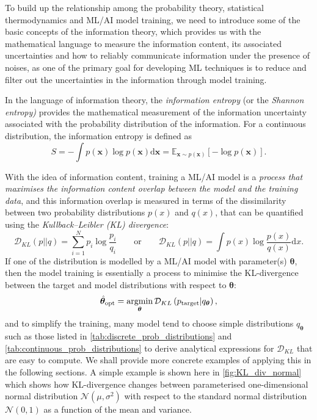 
To build up the relationship among the probability theory, statistical thermodynamics and ML/AI model training, we need to introduce some of the basic concepts of the information theory, which provides us with the mathematical language to measure the information content, its associated uncertainties and how to reliably communicate information under the presence of noises, as one of the primary goal for developing ML techniques is to reduce and filter out the uncertainties in the information through model training. 

In the language of information theory, the \emph{information entropy} (or the \emph{Shannon entropy)} provides the mathematical measurement of the information uncertainty associated with the probability distribution of the information. For a continuous distribution, the information entropy is defined as
\begin{equation}
    \label{eq:information_entropy}
    S=-\int p(\bm{x})\log p(\bm{x})\mbox{d}\bm{x}=\mathbb{E}_{\bm{x}\sim p(\bm{x})}\left[-\log p(\bm{x})\right].
\end{equation}


With the idea of information content, training a ML/AI model is a \textit{process that maximises the information content overlap between the model and the training data}, and this information overlap is measured in terms of the dissimilarity between two probability distributions $p(x)$ and $q(x)$, that can be quantified using the \textit{Kullback–Leibler (KL) divergence}:
\begin{equation}
    \label{eq:KL_divergence}
    \mathcal{D}_{KL}(p||q)=\sum_{i=1}^{N}p_i\log\frac{p_i}{q_i}\qquad\mbox{or}\qquad \mathcal{D}_{KL}(p||q)=\int p(x)\log\frac{p(x)}{q(x)}\mbox{d}x.
\end{equation}
If one of the distribution is modelled by a ML/AI model with parameter(s) $\boldsymbol{\theta}$, then the model training is essentially a process to minimise the KL-divergence between the target and model distributions with respect to $\boldsymbol{\theta}$:
\begin{equation}
    \label{eq:training_KL_minimise}
    \hat{\boldsymbol{\theta}}_{\mathrm{opt}} = \operatorname*{argmin}_{\boldsymbol{\theta}}\mathcal{D}_{KL} \left(p_{\mathrm{target}}|q_{\boldsymbol{\theta}}\right),
\end{equation}
and to simplify the training, many model tend to choose simple distributions $q_{\boldsymbol{\theta}}$ such as those listed in \cref{tab:discrete_prob_distributions} and \cref{tab:continuous_prob_distributions} to derive analytical expressions for $\mathcal{D}_{KL}$ that are easy to compute. We shall provide more concrete examples of applying this in the following sections.  A simple example is shown here in \cref{fig:KL_div_normal} which shows how KL-divergence changes between parameterised one-dimensional normal distribution $\mathcal{N}(\mu,\sigma^2)$ with respect to the standard normal distribution $\mathcal{N}(0,1)$ as a function of the mean and variance. 




